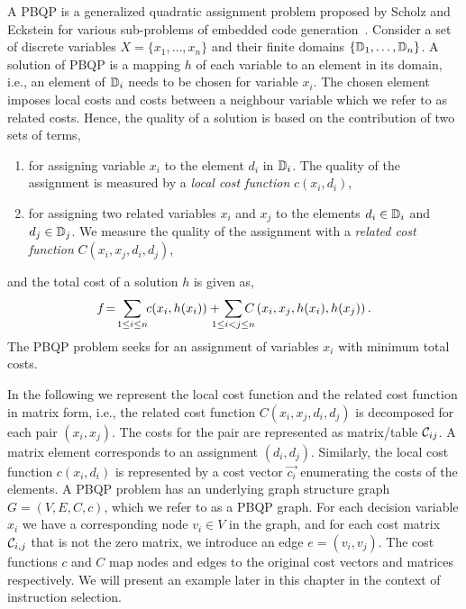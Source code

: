 A PBQP is a generalized quadratic assignment problem proposed by
Scholz and Eckstein for various sub-problems of embedded code
generation~\cite{ScholzE02,Eck03}. Consider a set of discrete
variables $X=\{x_1,\ldots,x_n\}$ and their finite domains
$\{\mathbb D_1,\ldots,\mathbb D_n\}$. A solution of PBQP is a
mapping $h$ of each variable to an element in its domain, i.e.,
an element of $\mathbb D_i$ needs to be chosen for variable
$x_i$. The chosen element imposes local costs and costs
between a neighbour variable which we refer to as related costs.  
Hence, the quality of a solution is based on the contribution of 
two sets of terms,
\begin{enumerate}
\item for assigning variable $x_i$ to the element $d_i$ in
  $\mathbb D_i$. The quality of the assignment is measured by a
  \emph{local cost function} $c(x_i, d_i)$,
\item for assigning two related variables $x_i$ and $x_j$ to the
  elements $d_i \in \mathbb D_i$ and $d_j \in \mathbb D_j$.  We
  measure the quality of the assignment with a \emph{related cost
    function\/} $C(x_i,x_j, d_i,d_j)$,
\end{enumerate}
and the total cost of a solution $h$ is given as,
\begin{equation}
  f\! =\! \sum_{1 \leq i \leq n} \hspace{-1mm} c(x_i,h(x_i)) + \hspace{-3mm} \sum_{1 \leq i < j  \leq n} \hspace{-3.5mm}
  C\left (x_i,x_j, h(x_i), h(x_j) \right). \label{eqn-pbqp}
\end{equation}
The PBQP problem seeks for an assignment of variables $x_i$ with minimum total costs.

In the following we represent the local cost function and the related cost 
function in matrix form, i.e., the related cost function 
$C(x_i,x_j,d_i,d_j)$ is decomposed for each
pair $(x_i,x_j)$. The costs for the pair are represented as matrix/table
${\mathcal C}_{ij}$. A matrix element corresponds to an assignment
$(d_i, d_j)$. Similarly, the local cost function $c(x_i,d_i)$ is
represented by a cost vector $\vec{c_i}$ enumerating the costs
of the elements.
A PBQP problem has an underlying graph structure graph $G=(V,E,C,c)$,
which we refer to as a PBQP graph. For each decision variable
$x_i$ we have a corresponding node $v_i \in V$ in the graph, and
for each cost matrix ${\mathcal C}_{i,j}$ that is not the zero
matrix, we introduce an edge $e=(v_i,v_j)$. The cost functions $c$ and
$C$ map nodes and edges to the original cost vectors and matrices
respectively.  We will present an example later in this chapter in the
context of instruction selection.


